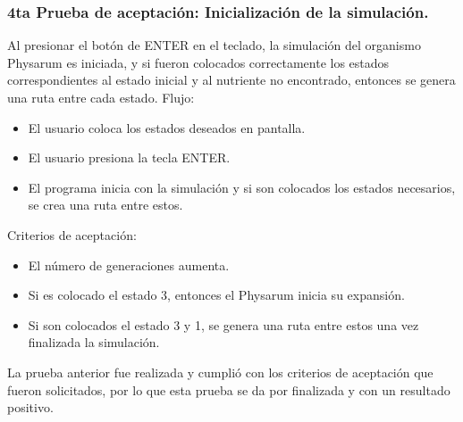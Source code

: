     \subsubsection{4ta Prueba de aceptaci\'on: Inicializaci\'on de la simulaci\'on.}
    Al presionar el bot\'on de ENTER en el teclado, la simulaci\'on
        del organismo Physarum es iniciada, y si fueron colocados
        correctamente los estados correspondientes al estado inicial
        y al nutriente no encontrado, entonces se genera una ruta
        entre cada estado.
    \vskip 0.5cm
    Flujo:
    \vskip 0.5cm
    \begin{itemize}
        \item El usuario coloca los estados deseados en pantalla.
        \item El usuario presiona la tecla ENTER.
        \item El programa inicia con la simulaci\'on y si son colocados
        los estados necesarios, se crea una ruta entre estos.
    \end{itemize}
    \vskip 0.5cm
    Criterios de aceptaci\'on:
    \begin{itemize}
        \item El n\'umero de generaciones aumenta.
        \item Si es colocado el estado 3, entonces el Physarum inicia
        su expansi\'on.
        \item Si son colocados el estado 3 y 1, se genera una ruta entre
        estos una vez finalizada la simulaci\'on.
    \end{itemize}
    La prueba anterior fue realizada y cumpli\'o con los criterios
        de aceptaci\'on que fueron solicitados, por lo que esta prueba
        se da por finalizada y con un resultado positivo.